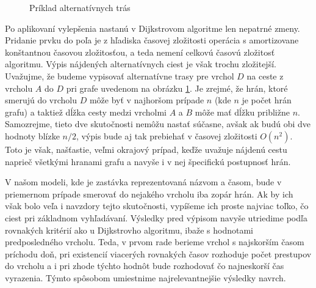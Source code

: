 \begin{figure}[H]
  \caption{Príklad alternatívnych trás}
  \label{alternativ_priklad2}
\end{figure}

Po aplikovaní vylepšenia nastanú v Dijkstrovom algoritme len nepatrné zmeny. Pridanie prvku do poľa je z hľadiska časovej zložitosti operácia s amortizovane konštantnou časovou zložitosťou, a teda nemení celkovú časovú zložitosť algoritmu. Výpis nájdených alternatívnych ciest je však trochu zložitejší. Uvažujme, že budeme vypisovať alternatívne trasy pre vrchol $D$ na ceste z vrcholu $A$ do $D$ pri grafe uvedenom na obrázku \ref{alternativ_priklad2}. Je zrejmé, že hrán, ktoré smerujú do vrcholu $D$ môže byť v najhoršom prípade $n$ (kde $n$ je počet hrán grafu) a taktiež dĺžka cesty medzi vrcholmi $A$ a $B$ môže mať dĺžku približne $n$. Samozrejme, tieto dve skutočnosti nemôžu nastať súčasne, avšak ak budú obi dve hodnoty blízke $n/2$, výpis bude aj tak prebiehať v časovej zložitosti $O(n^{2})$. Toto je však, našťastie, veľmi okrajový prípad, keďže uvažuje nájdenú cestu naprieč všetkými hranami grafu a navyše i v nej špecifickú postupnosť hrán.\newline

V našom modeli, kde je zastávka reprezentovaná názvom a časom, bude v priemernom prípade smerovať do nejakého vrcholu iba zopár hrán. Ak by ich však bolo veľa i navzdory tejto skutočnosti, vypíšeme ich proste najviac toľko, čo ciest pri základnom vyhľadávaní. Výsledky pred výpisom navyše utriedime podľa rovnakých kritérií ako u Dijkstrovho algoritmu, ibaže s hodnotami predposledného vrcholu. Teda, v prvom rade berieme vrchol s najskorším časom príchodu doň, pri existencií viacerých rovnakých časov rozhoduje počet prestupov do vrcholu a i pri zhode týchto hodnôt bude rozhodovať čo najneskorší čas vyrazenia. Týmto spôsobom umiestnime najrelevantnejšie výsledky navrch.\newline

